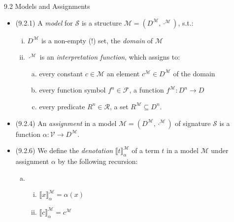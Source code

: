 \begin{frame}{9.2 Models and Assignments}

	\begin{itemize}
		
		\item {(9.2.1) A \emph{model} for $\mathcal{S}$ is a structure $\mathcal{M}=(D^\mathcal{M},\cdot^\mathcal{M})$, s.t.:
		\begin{enumerate}[(i)]
		
			\item $D^\mathcal{M}$ is a non-empty (!) set, the \emph{domain} of $\mathcal{M}$
			
			\item $\cdot^\mathcal{M}$ is an \emph{interpretation function}, which assigns to:
			\begin{enumerate}[(a)]
			
				\item every constant $c\in\mathcal{M}$ an element $c^\mathcal{M}\in D^\mathcal{M}$ of the domain
				
				\item every function symbol $f^n\in\mathcal{F}$, a function $f^\mathcal{M}:D^n\to D$
				
				\item every predicate $R^n\in\mathcal{R}$, a set $R^\mathcal{M}\subseteq D^n$.
			
			\end{enumerate}
		\end{enumerate}}
			
		\item \alert{(9.2.4) An \emph{assignment} in a model $\mathcal{M}=(D^\mathcal{M},\cdot^\mathcal{M})$ of signature $\mathcal{S}$ is a function $\alpha:\mathcal{V}\to D^\mathcal{M}$.}
		
		\item (9.2.6) We define the \emph{denotation} $\llbracket t\rrbracket_\alpha^\mathcal{M}$ of a term $t$ in a model $\mathcal{M}$ under assignment $\alpha$ by the following recursion:
		
			\begin{enumerate}[(a)]
			
				\item		\begin{enumerate}[(i)]

					\item $\llbracket x\rrbracket_\alpha^\mathcal{M}=\alpha(x)$
					\item $\llbracket c\rrbracket_\alpha^\mathcal{M}=c^\mathcal{M}$
				

\end{enumerate}
\end{enumerate}
\end{itemize}
\end{frame}
